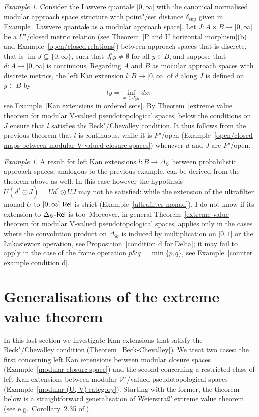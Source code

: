 \documentclass[preprint, a4paper]{elsarticle}
\theoremstyle{definition}
\theoremstyle{remark}
\newtheorem{example}[theorem]{Example}
\providecommand{\exref}[1]{Example~\ref{#1}}
\providecommand{\propref}[1]{Proposition~\ref{#1}}
\providecommand{\thmref}[1]{Theorem~\ref{#1}}
\providecommand{\brcs}[1]{\lbrace #1 \rbrace}
\providecommand{\brks}[1]{\lbrack #1 \rbrack}
\providecommand{\set}[1]{\brcs{#1}}
\providecommand{\rev}[1]{#1^\circ}
\newcommand{\tn}{\mathbin\&}
\providecommand{\map}[3]{#1\colon#2\to#3}
\DeclareMathOperator{\im}{im}
\providecommand{\catvar}[1]{\mathcal{#1}}
\providecommand{\2}{\mathsf 2}
\providecommand{\V}{\catvar V}
\providecommand{\Rel}{\mathsf{Rel}}
\providecommand{\enRel}[1]{#1\text-\Rel}
\providecommand{\hc}{\odot}
\begin{document}
	\begin{example}
		Consider the Lawvere quantale $\brks{0, \infty}$ with the canonical normalised modular approach space structure with point"/set distance $\delta_{\sup}$ given in \exref{Lawvere quantale as a modular approach space}. Let $\map J{A \times B}{\brks{0, \infty}}$ be a $U$"/closed metric relation (see \thmref{P and U horizontal morphism}(b) and \exref{open/closed relations}) between approach spaces that is discrete, that is $\im J \subseteq \set{0, \infty}$, such that $\rev J_0 y \neq \emptyset$ for all $y \in B$, and suppose that $\map dA{\brks{0, \infty}}$ is continuous. Regarding $A$ and $B$ as modular approach spaces with discrete metrics, the left Kan extension $\map lB{\brks{0, \infty}}$ of $d$ along $J$ is defined on $y \in B$ by
		\begin{displaymath}
			ly = \inf_{x \in \rev J_0 y} dx;
		\end{displaymath}
		see \exref{Kan extensions in ordered sets}. By \thmref{extreme value theorem for modular V-valued pseudotopological spaces} below the conditions on $J$ ensure that $l$ satisfies the Beck"/Chevalley condition. It thus follows from the previous theorem that $l$ is continuous, while it is $P$"/open (\exref{open/closed maps between modular V-valued closure spaces}) whenever $d$ and $J$ are $P$"/open.
	\end{example}
	
	\begin{example}
		A result for left Kan extensions $\map lB{\Delta_{\tn}}$ between probabilistic approach spaces, analogous to the previous example, can be derived from the theorem above as well. In this case however the hypothesis $U(d^* \hc J) = Ud^* \hc UJ$ may not be satisfied: while the extension of the ultrafilter monad $U$ to $\enRel{\brks{0, \infty}}$ is strict (\exref{ultrafilter monad}), I do not know if its extension to $\enRel{\Delta_{\tn}}$ is too. Moreover, in general \thmref{extreme value theorem for modular V-valued pseudotopological spaces} applies only in the cases where the convolution product on $\Delta_{\tn}$ is induced by multiplication on $\brks{0, 1}$ or the \L ukasiewicz operation, see \propref{condition d for Delta}; it may fail to apply in the case of the frame operation $p \tn q = \min\set{p, q}$, see \exref{counter example condition d}.
	\end{example}
	
	\section{Generalisations of the extreme value theorem} \label{extreme value theorem section}
	In this last section we investigate Kan extensions that satisfy the Beck"/Chevalley condition (\thmref{Beck-Chevalley}). We treat two cases: the first concerning left Kan extensions between modular closure spaces (\exref{modular closure space}) and the second concerning a restricted class of left Kan extensions between modular $\V$"/valued pseudotopological spaces (\exref{modular (U, V)-category}). Starting with the former, the theorem below is a straightforward generalisation of Weierstra\ss' extreme value theorem (see e.g.\ Corollary~2.35 of \cite{Aliprantis-Border06}).
	
\end{document}
